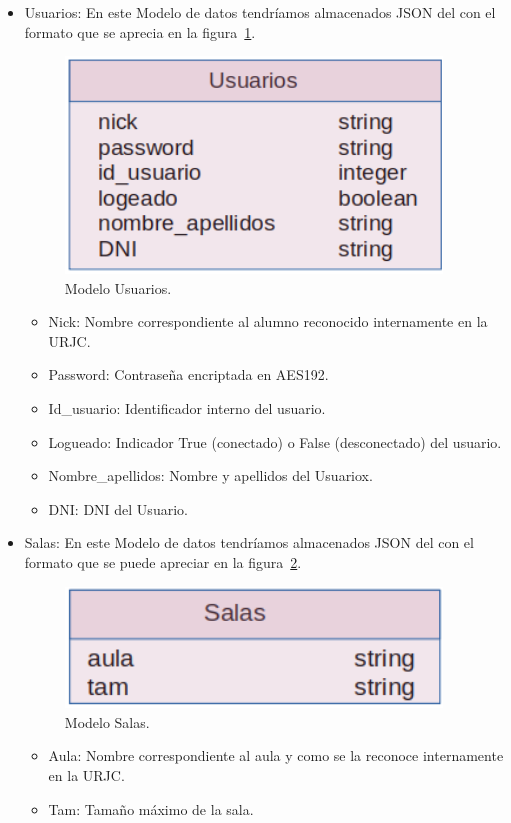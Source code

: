 \documentclass[a4paper, 12pt]{book}
\begin{document}
\begin{itemize}
	\item Usuarios: En este Modelo de datos tendríamos almacenados JSON del con el formato que se aprecia en la figura~\ref{fig:mongoDBUsuarios}.
	\begin{figure}[h!]
  	\centering
  	\includegraphics[width=10cm, keepaspectratio]{img/mongoDBUsuarios.png}
  	\caption{Modelo Usuarios.}\label{fig:mongoDBUsuarios}
	\end{figure}
		\begin{itemize}
		\item Nick: Nombre correspondiente al alumno reconocido internamente en la URJC.
		\item Password: Contraseña encriptada en AES192.
		\item Id\_usuario: Identificador interno del usuario.
		\item Logueado: Indicador True (conectado) o False (desconectado) del usuario.
		\item Nombre\_apellidos: Nombre y apellidos del Usuariox.
		\item DNI: DNI del Usuario.
		\end{itemize}
	
	\item Salas: En este Modelo de datos tendríamos almacenados JSON del con el formato que se puede apreciar en la figura~\ref{fig:mongoDBSalas}.
	\begin{figure}[h!]
  	\centering
  	\includegraphics[width=10cm, keepaspectratio]{img/mongoDBSalas.png}
  	\caption{Modelo Salas.}\label{fig:mongoDBSalas}
	\end{figure}
	
	\begin{itemize}
		\item Aula: Nombre correspondiente al aula y como se la reconoce internamente en la URJC.
		\item Tam: Tamaño máximo de la sala.
	\end{itemize}
	

\end{itemize}
\end{document}
